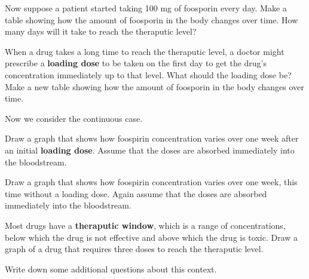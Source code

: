\documentclass[handout,space,nooutcomes]{ximera}
\begin{document}
\begin{question}
Now suppose a patient started taking 100 mg of foosporin every day.  Make a table showing how the amount of foosporin in the body changes over time.  How many days will it take to reach the theraputic level?  
\begin{freeResponse}
\end{freeResponse}
\end{question}

\begin{question}
When a drug takes a long time to reach the theraputic level, a doctor might prescribe a \textbf{loading dose} to be taken on the first day to get the drug's concentration immediately up to that level.  What should the loading dose be?  Make a new table showing how the amount of foosporin in the body changes over time.  
\begin{freeResponse}
\end{freeResponse}
\end{question}

Now we consider the continuous case.  
\begin{question}
Draw a graph that shows how foospirin concentration varies over one week after an initial \textbf{loading dose}.  Assume that the doses are absorbed immediately into the bloodstream.  
\begin{freeResponse}
\end{freeResponse}
\end{question}

\begin{question}
Draw a graph that shows how foospirin concentration varies over one week, this time without a loading dose.  Again assume that the doses are absorbed immediately into the bloodstream.  
\begin{freeResponse}
\end{freeResponse}
\end{question}

\begin{question}
Most drugs have a \textbf{theraputic window}, which is a range of concentrations, below which the drug is not effective and above which the drug is toxic.  Draw a graph of a drug that requires three doses to reach the theraputic level.  
\begin{freeResponse}
\end{freeResponse}
\end{question}

\begin{question}
Write down some additional questions about this context.       
\begin{freeResponse}
\end{freeResponse}
\end{question}
\end{document}
